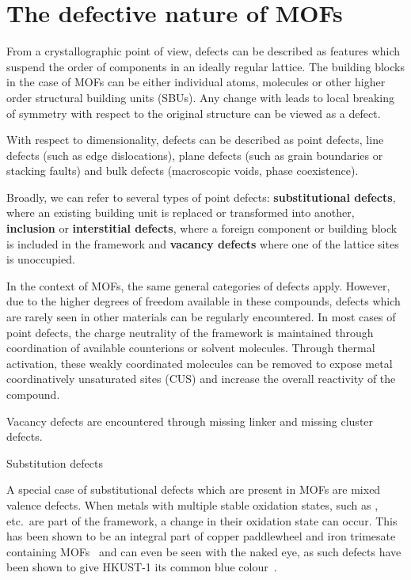 
\section{The defective nature of MOFs}

From a crystallographic point of view, defects can be described
as features which suspend the order of components in an ideally 
regular lattice. The building blocks in the case of MOFs can be either
individual atoms, molecules or other higher order structural building
units (SBUs). Any change with leads to local breaking of symmetry with
respect to the original structure can be viewed as a defect.

With respect to dimensionality, defects can be described 
as point defects, line defects (such as edge dislocations), 
plane defects (such as grain boundaries or stacking faults) and bulk 
defects (macroscopic voids, phase coexistence).

Broadly, we can refer to several types of point defects: 
\textbf{substitutional defects}, where an existing building unit is 
replaced or transformed into another, \textbf{inclusion} or 
\textbf{interstitial defects}, where a foreign component
or building block is included in the framework and \textbf{vacancy defects}
where one of the lattice sites is unoccupied.

In the context of MOFs, the same general categories of defects 
apply. However, due to the higher degrees of freedom available in 
these compounds, defects which are rarely seen in other materials 
can be regularly encountered. 
In most cases of point defects, the charge neutrality of the framework
is maintained through coordination of available counterions or solvent 
molecules. Through thermal activation, these weakly coordinated 
molecules can be removed to expose metal coordinatively unsaturated sites
(CUS) and increase the overall reactivity of the compound.

Vacancy defects are encountered through missing linker and 
missing cluster defects. 

Substitution defects 

A special case of substitutional defects which are present in MOFs 
are mixed valence defects. When metals with multiple stable oxidation
states, such as ,  etc.\ are part of 
the framework, a change in their oxidation state can occur. This has
been shown to be an integral part of copper paddlewheel and 
iron trimesate containing 
MOFs~\cite{yoonControlledReducibilityMetalOrganic2010} and can even be 
seen with the naked eye, as such defects have been shown 
to give HKUST-1 its common blue colour~\cite{mullerDefectsColorCenters2017}.

